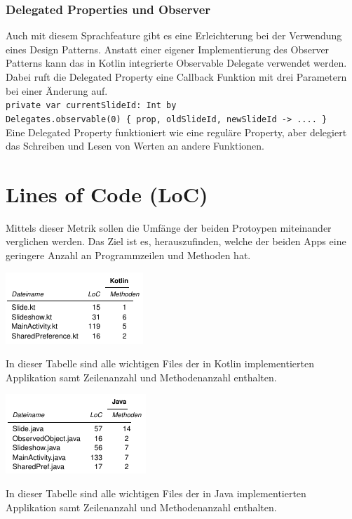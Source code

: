 \documentclass{sigchi-ext}
\begin{document}
\subsubsection{Delegated Properties und Observer}
Auch mit diesem Sprachfeature gibt es eine Erleichterung bei der Verwendung eines Design Patterns. Anstatt einer eigener Implementierung des Observer Patterns kann das in Kotlin integrierte Observable Delegate verwendet werden. Dabei ruft die Delegated Property eine Callback Funktion mit drei Parametern bei einer Änderung auf. \\\vskip 0.1in \texttt{private var currentSlideId: Int by \\Delegates.observable(0) \{ prop, oldSlideId, newSlideId -> .... \}} \\\vskip 0.1in Eine Delegated Property funktioniert wie eine reguläre Property, aber delegiert das Schreiben und Lesen von Werten an andere Funktionen. \cite{delegates}

\section{Lines of Code (LoC)}
Mittels dieser Metrik sollen die Umfänge der beiden Protoypen miteinander verglichen werden. Das Ziel ist es, herauszufinden, welche der beiden Apps eine geringere Anzahl an Programmzeilen und Methoden hat.

\begin{marginfigure}[-20pc]
  \begin{minipage}{\marginparwidth}
    \centering
    \includegraphics[width=1.05\marginparwidth]{figures/Kotlin-Tabelle.png}
    \caption{In dieser Tabelle sind alle wichtigen Files der in Kotlin implementierten Applikation samt Zeilenanzahl und Methodenanzahl enthalten.}
  \end{minipage}
\end{marginfigure}

\begin{marginfigure}[-3pc]
  \begin{minipage}{\marginparwidth}
    \centering
    \includegraphics[width=1.05\marginparwidth]{figures/Java-Tabelle.png}
    \caption{In dieser Tabelle sind alle wichtigen Files der in Java implementierten Applikation samt Zeilenanzahl und Methodenanzahl enthalten. }
  \end{minipage}
\end{marginfigure}
\end{document}
